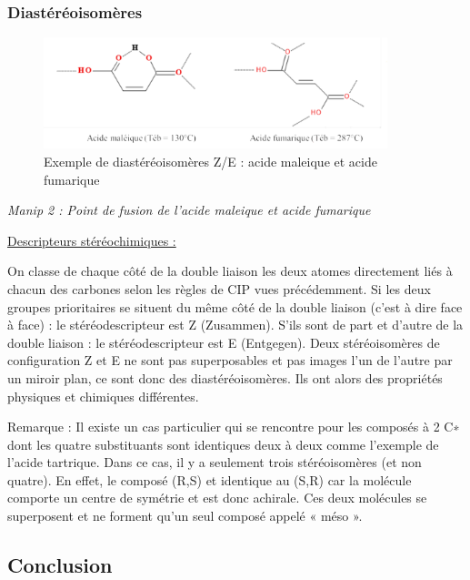 \documentclass{article}%
\begin{document}
\subsubsection{Diastéréoisomères}


\begin{figure}
	\centerline{\includegraphics[width=10cm]{images/liaison_intramol.png}}
	\caption{Exemple de diastéréoisomères Z/E : acide maleique et acide fumarique}
\end{figure}
\textit{Manip 2 : Point de fusion de l'acide maleique et acide fumarique}

\underline{Descripteurs stéréochimiques : }

On classe de chaque côté de la double liaison les deux atomes directement
liés à chacun des carbones selon les règles de CIP vues précédemment. Si les deux groupes prioritaires se situent
du même côté de la double liaison (c’est à dire face à face) : le stéréodescripteur est Z (Zusammen). S’ils sont
de part et d’autre de la double liaison : le stéréodescripteur est E (Entgegen).
Deux stéréoisomères de configuration Z et E ne sont pas superposables et pas images l’un de l’autre par un
miroir plan, ce sont donc des diastéréoisomères. Ils ont alors des propriétés physiques et chimiques différentes.


Remarque : Il existe un cas particulier qui se rencontre pour les composés à 2 C∗ dont les quatre substituants sont identiques deux à deux comme l’exemple de l’acide tartrique. Dans ce cas, il y a seulement trois stéréoisomères (et non quatre). En effet, le composé (R,S) et identique au (S,R) car la molécule comporte un centre de symétrie et est donc achirale. Ces deux molécules se superposent et ne forment qu’un seul composé appelé « méso ».

\subsection{Conclusion}
\end{document}

